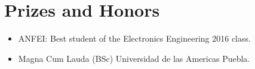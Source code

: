 \section{Prizes and Honors}

\begin{itemize}
\item ANFEI: Best student of the Electronics Engineering 2016
  class.
\item Magna Cum Lauda (BSc) Universidad de las
  Americas Puebla.
\end{itemize}


